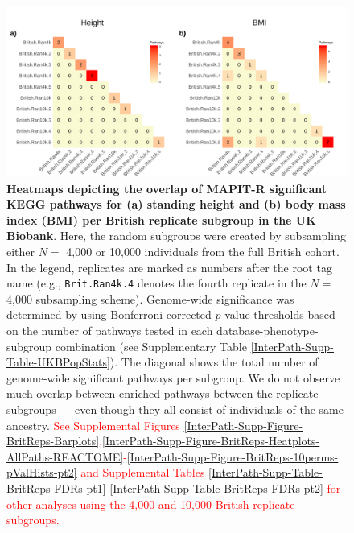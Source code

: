 \documentclass[10pt]{article}
\begin{document}

\begin{landscape}
\begin{figure}[htbp]
\centering
\includegraphics[scale=.2]{Images/Supp/InterPath_Supp_Figure_BritReps_Heatplots_KEGG_vs5.png}
\caption{\textbf{Heatmaps depicting the overlap of MAPIT-R significant KEGG pathways for (a) standing height and (b) body mass index (BMI) per British replicate subgroup in the UK Biobank}. Here, the random subgroups were created by subsampling either $N =$ 4,000 or 10,000 individuals from the full British cohort. In the legend, replicates are marked as numbers after the root tag name (e.g., \texttt{Brit.Ran4k.4} denotes the fourth replicate in the $N =$ 4,000 subsampling scheme). Genome-wide significance was determined by using Bonferroni-corrected $p$-value thresholds based on the number of pathways tested in each database-phenotype-subgroup combination (see Supplementary Table \ref{InterPath-Supp-Table-UKBPopStats}). The diagonal shows the total number of genome-wide significant pathways per subgroup. We do not observe much overlap between enriched pathways between the replicate subgroups --- even though they all consist of individuals of the same ancestry. \textcolor{red}{See Supplemental Figures \ref{InterPath-Supp-Figure-BritReps-Barplots},\ref{InterPath-Supp-Figure-BritReps-Heatplots-AllPaths-REACTOME}-\ref{InterPath-Supp-Figure-BritReps-10perms-pValHists-pt2} and Supplemental Tables \ref{InterPath-Supp-Table-BritReps-FDRs-pt1}-\ref{InterPath-Supp-Table-BritReps-FDRs-pt2} for other analyses using the 4,000 and 10,000 British replicate subgroups.}}
\label{InterPath-Supp-Figure-BritReps-Heatplots-AllPaths-KEGG}
\end{figure}
\clearpage
\end{landscape}

\end{document}
